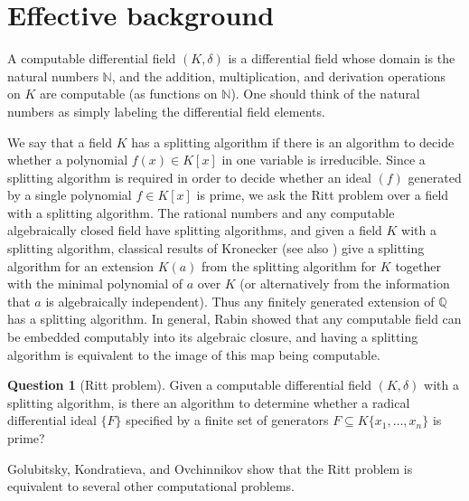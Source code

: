 \documentclass[12pt]{amsart}
\theoremstyle{definition}
\newtheorem{question}[theorem]{Question}
\numberwithin{subcase}{cases}
\theoremstyle{remark}
\begin{document}
\section{Effective background} \label{effectivesection}

A computable differential field $(K,\delta)$ is a differential field whose domain is the natural numbers $\mathbb{N}$, and the addition, multiplication, and derivation operations on $K$ are computable (as functions on $\mathbb{N}$). One should think of the natural numbers as simply labeling the differential field elements.

We say that a field $K$ has a splitting algorithm if there is an algorithm to decide whether a polynomial $f(x) \in K[x]$ in one variable is irreducible. Since a splitting algorithm is required in order to decide whether an ideal $(f)$ generated by a single polynomial $f \in K[x]$ is prime, we ask the Ritt problem over a field with a splitting algorithm. The rational numbers and any computable algebraically closed field have splitting algorithms, and given a field $K$ with a splitting algorithm, classical results of Kronecker \cite{Kronecker82} (see also \cite{vanderWarden70}) give a splitting algorithm for an extension $K(a)$ from the splitting algorithm for $K$ together with the minimal polynomial of $a$ over $K$ (or alternatively from the information that $a$ is algebraically independent). Thus any finitely generated extension of $\mathbb{Q}$ has a splitting algorithm. In general, Rabin \cite{Rabin60} showed that any computable field can be embedded computably into its algebraic closure, and having a splitting algorithm is equivalent to the image of this map being computable.

\begin{question}[Ritt problem]
    Given a computable differential field $(K,\delta)$ with a splitting algorithm, is there an algorithm to determine whether a radical differential ideal $\{F\}$ specified by a finite set of generators $F \subseteq K\{x_1,\ldots,x_n\}$ is prime?
\end{question}

Golubitsky, Kondratieva, and Ovchinnikov \cite{GolubitskyKondratievaOvchinnikov09} show that the Ritt problem is equivalent to several other computational problems.
\end{document}

